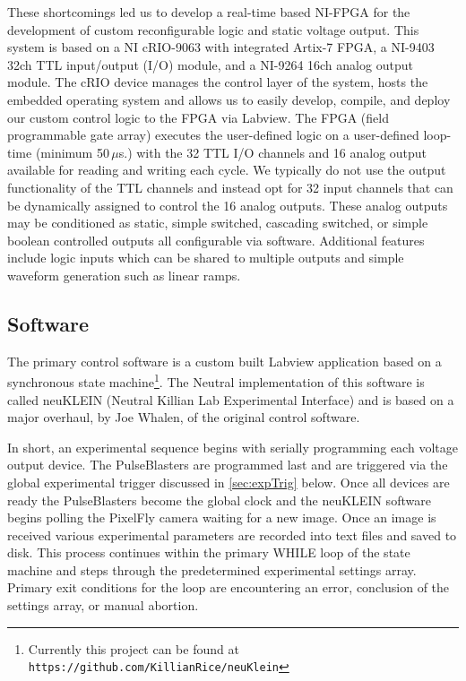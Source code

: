 These shortcomings led us to develop a real-time based NI-FPGA for the development of custom reconfigurable logic and static voltage output.
This system is based on a NI cRIO-9063 with integrated Artix-7 FPGA, a NI-9403 32ch TTL input/output (I/O) module, and a NI-9264 16ch analog output module.
The cRIO device manages the control layer of the system, hosts the embedded operating system and allows us to easily develop, compile, and deploy our custom control logic to the FPGA via Labview.
The FPGA (field programmable gate array) executes the user-defined logic on a user-defined loop-time (minimum 50\,$\mu$s.) with the 32 TTL I/O channels and 16 analog output available for reading and writing each cycle.
We typically do not use the output functionality of the TTL channels and instead opt for 32 input channels that can be dynamically assigned to control the 16 analog outputs.
These analog outputs may be conditioned as static, simple switched, cascading switched, or simple boolean controlled outputs all configurable via software.
Additional features include logic inputs which can be shared to multiple outputs and simple waveform generation such as linear ramps.

\subsection{Software} \label{ssec:soft_sys}
The primary control software is a custom built Labview application based on a synchronous state machine\footnote{Currently this project can be found at \texttt{https://github.com/KillianRice/neuKlein}}.
The Neutral implementation of this software is called neuKLEIN (Neutral Killian Lab Experimental Interface) and is based on a major overhaul, by Joe Whalen, of the original control software.

In short, an experimental sequence begins with serially programming each voltage output device.
The PulseBlasters are programmed last and are triggered via the global experimental trigger discussed in \ref{sec:expTrig} below.
Once all devices are ready the PulseBlasters become the global clock and the neuKLEIN software begins polling the PixelFly camera waiting for a new image.
Once an image is received various experimental parameters are recorded into text files and saved to disk.
This process continues within the primary WHILE loop of the state machine and steps through the predetermined experimental settings array.
Primary exit conditions for the loop are encountering an error, conclusion of the settings array, or manual abortion.

